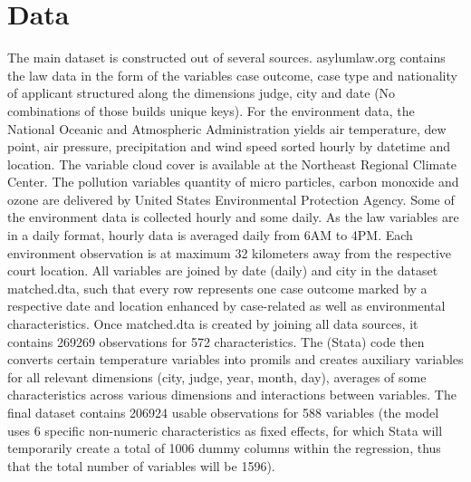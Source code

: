 \documentclass[11pt]{article}
\begin{document}
	\section{Data}
	The main dataset is constructed out of several sources. asylumlaw.org contains the law data in the form of the variables case outcome, case type and nationality of applicant structured along the dimensions judge, city and date (No combinations of those builds unique keys). For the environment data, the National Oceanic and Atmospheric Administration yields air temperature, dew point, air pressure, precipitation and wind speed sorted hourly by datetime and location. The variable cloud cover is available at the Northeast Regional Climate Center. The pollution variables quantity of micro particles, carbon monoxide and ozone are delivered by United States Environmental Protection Agency. Some of the environment data is collected hourly and some daily. As the law variables are in a daily format, hourly data is averaged daily from 6AM to 4PM. Each environment observation is at maximum 32 kilometers away from the respective court location.
	All variables are joined by date (daily) and city in the dataset matched.dta, such that every row represents one case outcome marked by a respective date and location enhanced by case-related as well as environmental characteristics. \newline
	Once matched.dta is created by joining all data sources, it contains 269269 observations for 572 characteristics. The (Stata) code then converts certain temperature variables into promils and creates auxiliary variables for all relevant dimensions (city, judge, year, month, day), averages of some characteristics across various dimensions and interactions between variables. The final dataset contains 206924 usable observations for 588 variables (the model uses 6 specific non-numeric characteristics as fixed effects, for which Stata will temporarily create a total of 1006 dummy columns within the regression, thus that the total number of variables will be 1596).
	\newline	
\end{document}
